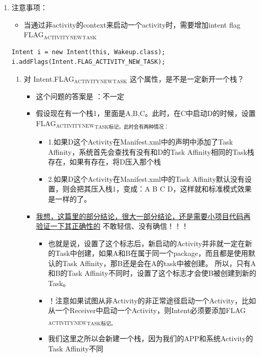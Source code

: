 \documentclass[9pt, b5paaper]{book}
\begin{document}
\begin{enumerate}
\item 注意事项：
\label{sec-4-6-2-7}
\begin{itemize}
\item 当通过非activity的context来启动一个activity时，需要增加intent flag FLAG$_{\text{ACTIVITY}}$$_{\text{NEW}}$$_{\text{TASK}}$
\end{itemize}
\begin{verbatim}
Intent i = new Intent(this, Wakeup.class);
i.addFlags(Intent.FLAG_ACTIVITY_NEW_TASK);
\end{verbatim}
\begin{enumerate}
\item 对 Intent.FLAG$_{\text{ACTIVITY}}$$_{\text{NEW}}$$_{\text{TASK}}$ 这个属性，是不是一定新开一个栈？
\label{sec-4-6-2-7-1}
\begin{itemize}
\item 这个问题的答案是 ：不一定
\item 假设现在有一个栈1，里面是A,B,C。此时，在C中启动D的时候，设置FLAG$_{\text{ACTIVITY}}$$_{\text{NEW}}$$_{\text{TASK标记，此时会有两种情况：}}$
\begin{itemize}
\item 1.如果D这个Activity在Manifest.xml中的声明中添加了Task Affinity，系统首先会查找有没有和D的Task Affinity相同的Task栈存在，如果有存在，将D压入那个栈
\item 2.如果D这个Activity在Manifest.xml中的Task Affinity默认没有设置，则会把其压入栈1，变成：A B C D，这样就和标准模式效果是一样的了。
\end{itemize}
\item \uline{我想，这篇里的部分结论，很大一部分结论，还是需要小项目代码再验证一下其正确性的} 不敢轻信、没有确信！！！
\begin{itemize}
\item 也就是说，设置了这个标志后，新启动的Activity并非就一定在新的Task中创建，如果A和B在属于同一个package，而且都是使用默认的Task Affinity，那B还是会在A的task中被创建。 所以，只有A和B的Task Affinity不同时，设置了这个标志才会使B被创建到新的Task。
\item ！注意如果试图从非Activity的非正常途径启动一个Activity，比如从一个Receiver中启动一个Activity，则Intent必须要添加FLAG$_{\text{ACTIVITY}}$$_{\text{NEW}}$$_{\text{TASK标记。}}$
\item 我们这里之所以会新建一个栈，因为我们的APP和系统Activity的Task Affinity不同
\end{itemize}
\end{itemize}
\end{enumerate}
\end{enumerate}
\end{document}
